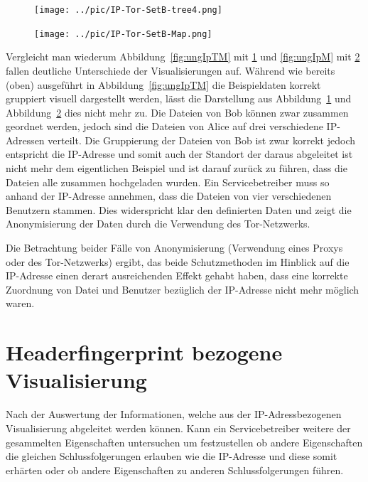 \documentclass[
    fontsize=12pt,
    headings=small,
    parskip=half,           %
    bibliography=totoc,
    numbers=noenddot,       %
    open=any,               %
    ]{scrreprt}
\begin{document}
\begin{figure}[H]
\texttt{[image: ../pic/IP-Tor-SetB-tree4.png]}
\label{fig:TIpTM}
\end{figure}

\begin{figure}[H]
\texttt{[image: ../pic/IP-Tor-SetB-Map.png]}
\label{fig:TIpM}
\end{figure}

Vergleicht man wiederum Abbildung~\ref{fig:ungIpTM} mit \ref{fig:TIpTM} und \ref{fig:ungIpM} mit \ref{fig:TIpM} fallen deutliche Unterschiede der Visualisierungen auf. 
Während wie bereits (oben) ausgeführt in Abbildung~\ref{fig:ungIpTM} die Beispieldaten korrekt gruppiert visuell dargestellt werden,
lässt die Darstellung aus Abbildung~\ref{fig:TIpTM} und Abbildung~\ref{fig:TIpM} dies nicht mehr zu.
Die Dateien von Bob können zwar zusammen geordnet werden, jedoch sind die Dateien von Alice auf drei verschiedene IP-Adressen verteilt.
Die Gruppierung der Dateien von Bob ist zwar korrekt jedoch entspricht die IP-Adresse und somit auch der Standort der daraus abgeleitet ist nicht mehr dem eigentlichen Beispiel und ist darauf zurück zu führen, dass die Dateien alle zusammen hochgeladen wurden.
Ein Servicebetreiber muss so anhand der IP-Adresse annehmen, dass die Dateien von vier verschiedenen Benutzern stammen.
Dies widerspricht klar den definierten Daten und zeigt die Anonymisierung der Daten durch die Verwendung des Tor-Netzwerks.

Die Betrachtung beider Fälle von Anonymisierung (Verwendung eines Proxys oder des Tor-Netzwerks) ergibt, das beide Schutzmethoden im Hinblick auf die IP-Adresse einen derart ausreichenden Effekt gehabt haben, dass eine korrekte Zuordnung von Datei und Benutzer bezüglich der IP-Adresse nicht mehr möglich waren.

\section{Headerfingerprint bezogene Visualisierung}
Nach der Auswertung der Informationen, welche aus der IP-Adressbezogenen Visualisierung abgeleitet werden können.
Kann ein Servicebetreiber weitere der gesammelten Eigenschaften untersuchen um festzustellen ob andere Eigenschaften die gleichen Schlussfolgerungen erlauben wie die IP-Adresse und diese somit erhärten oder ob andere Eigenschaften zu anderen Schlussfolgerungen führen.
\end{document}
